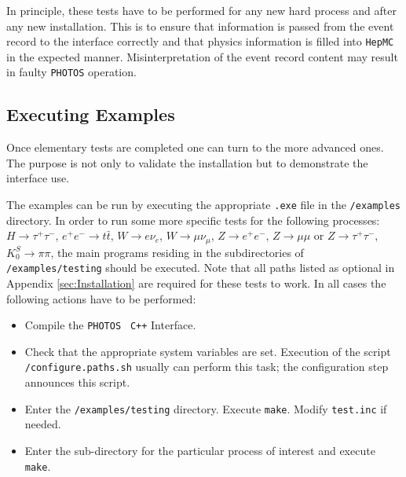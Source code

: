\documentclass[]{Photos_interface_design}
\begin{document}
In principle, these tests have to be performed for any new hard 
process and after any new installation. This is to ensure that 
information is passed from the event record to the interface 
correctly and that physics information is filled into {\tt HepMC} 
in the expected manner. Misinterpretation of the event record content may result in 
faulty {\tt PHOTOS} operation.


\subsection{Executing Examples}

Once elementary tests are completed one can turn to the more advanced ones.
The purpose is not only to validate the installation but to demonstrate the
interface use.

The examples can be run by executing the appropriate {\tt .exe} file in the {\tt /examples} directory.
In order to run some more specific tests for the following processes:
$H \rightarrow \tau^+ \tau^-$, $ e^+ e^- \rightarrow t \bar t$,
$W \rightarrow e \nu_e$, $W \rightarrow \mu \nu_\mu$,
$Z \rightarrow e^+ e^-$, $Z \rightarrow \mu \mu$ or $Z \rightarrow \tau^+ \tau^-$,
$K_{0}^{S} \rightarrow \pi \pi$,
the main programs residing in the subdirectories of {\tt /examples/testing} should be executed.
Note that all paths listed as optional in Appendix \ref{sec:Installation} are required for these
tests to work.
In all cases the following actions have to be performed:

\begin{itemize}
  \item Compile the {\tt PHOTOS } {\tt C++} Interface. 
 \item  Check that the appropriate system variables are set. Execution of  the script \\
{\tt /configure.paths.sh} usually can perform this task; the configuration step 
announces this script.
  \item Enter the {\tt /examples/testing} directory. Execute {\tt make}. 
Modify {\tt test.inc} if needed.
  \item Enter the sub-directory for the particular process of interest
and execute {\tt make}.
\end{itemize}
\end{document}
